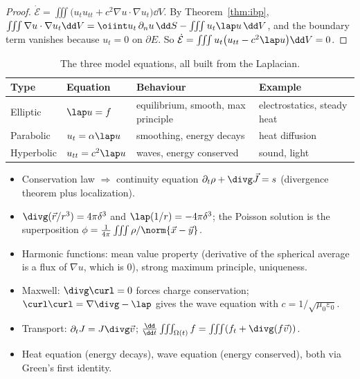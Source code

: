 \begin{proof}
$\dot{\mathcal E}=\iiint\bigl(u_tu_{tt}+c^2\nabla u\cdot\nabla u_t\bigr)\dd V$. By Theorem~\ref{thm:ibp}, $\iiint\nabla u\cdot\nabla u_t\dd V=\oiint u_t\,\partial_nu\,\dd S-\iiint u_t\lap u\,\dd V$, and the boundary term vanishes because $u_t=0$ on $\partial E$. So $\dot{\mathcal E}=\iiint u_t\bigl(u_{tt}-c^2\lap u\bigr)\dd V=0$.
\end{proof}

\begin{table}[ht]
\centering
\renewcommand{\arraystretch}{1.3}
\begin{tabular}{llll}
\toprule
\textbf{Type} & \textbf{Equation} & \textbf{Behaviour} & \textbf{Example} \\
\midrule
Elliptic & $\lap u=f$ & equilibrium, smooth, max principle & electrostatics, steady heat \\
Parabolic & $u_t=\alpha\lap u$ & smoothing, energy decays & heat diffusion \\
Hyperbolic & $u_{tt}=c^2\lap u$ & waves, energy conserved & sound, light \\
\bottomrule
\end{tabular}
\caption{The three model equations, all built from the Laplacian.}
\end{table}

\begin{summarybox}
\begin{itemize}
  \item Conservation law $\Rightarrow$ continuity equation $\partial_t\rho+\divg\vec J=s$ (divergence theorem plus localization).
  \item $\divg(\vec r/r^3)=4\pi\delta^3$ and $\lap(1/r)=-4\pi\delta^3$; the Poisson solution is the superposition $\phi=\frac1{4\pi}\iiint\rho/\norm{\vec x-\vec y}$.
  \item Harmonic functions: mean value property (derivative of the spherical average is a flux of $\nabla u$, which is $0$), strong maximum principle, uniqueness.
  \item Maxwell: $\divg\curl=0$ forces charge conservation; $\curl\curl=\nabla\divg-\lap$ gives the wave equation with $c=1/\sqrt{\mu_0\varepsilon_0}$.
  \item Transport: $\partial_tJ=J\divg\vec v$; $\frac{\dd}{\dd t}\iiint_{\Omega(t)}f=\iiint(f_t+\divg(f\vec v))$.
  \item Heat equation (energy decays), wave equation (energy conserved), both via Green's first identity.
\end{itemize}
\end{summarybox}

